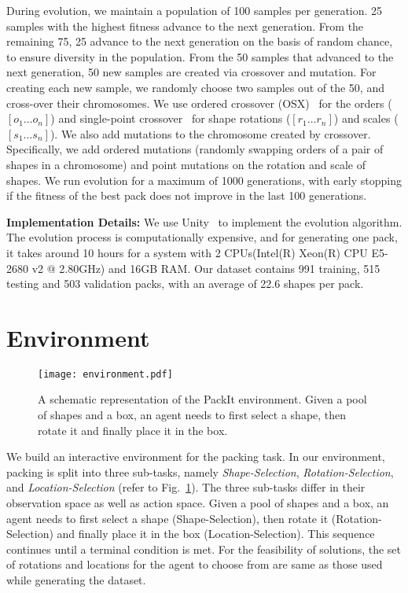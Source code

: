 \documentclass{article}
\begin{document}
During evolution, we maintain a population of 100 samples per generation. 25 samples with the highest fitness advance to the next generation. From the remaining 75, 25 advance to the next generation on the basis of random chance, to ensure diversity in the population. From the 50 samples that advanced to the next generation, 50 new samples are created via crossover and mutation. For creating each new sample, we randomly choose two samples out of the 50, and cross-over their chromosomes. We use ordered crossover 
(OSX)~\cite{davis1985applying} for the orders ($[o_1 \dots o_n]$) and single-point 
crossover~\cite{holland1992adaptation} for shape rotations ($[r_1 \dots r_n]$) and scales ($[s_1
\dots s_n]$). We also add mutations to the chromosome created by crossover. Specifically, we add ordered mutations (randomly swapping orders of a pair of shapes in a chromosome) and point mutations on the rotation and scale of shapes. We run evolution for a maximum of 1000 generations, with early stopping if the fitness of the best pack does not improve in the last 100 generations.

\noindent \textbf{Implementation Details: }We use Unity~\cite{goldstone2009unity} to implement the evolution algorithm. The evolution process is computationally expensive, and for generating one pack, it takes around 10 hours for a system with 2 CPUs(Intel(R) Xeon(R) CPU E5-2680 v2 @ 2.80GHz) and 16GB RAM. Our dataset contains 991 training, 515 testing and 503 validation packs, with an average of 22.6 shapes per pack.
\section{Environment}
\label{sec:environment}
\begin{figure}
  \centering
  \texttt{[image: environment.pdf]}
  \caption{A schematic representation of the PackIt environment. Given a pool of shapes and a box, an agent needs to first select a shape, then rotate it and finally place it in the box.}
  \centering
  \label{fig:env}
\end{figure}
We build an interactive environment for the packing task. In our environment, packing is split into three sub-tasks, namely \textit{Shape-Selection}, \textit{Rotation-Selection}, and \textit{Location-Selection} (refer to Fig.~\ref{fig:env}). The three sub-tasks differ in their observation space as well as action space. Given a pool of shapes and a box, an agent needs to first select a shape (Shape-Selection), then rotate it (Rotation-Selection) and finally place it in the box (Location-Selection). This sequence continues until a terminal condition is met. For the feasibility of solutions, the set of rotations and locations for the agent to choose from are same as those used while generating the dataset.
\end{document}
